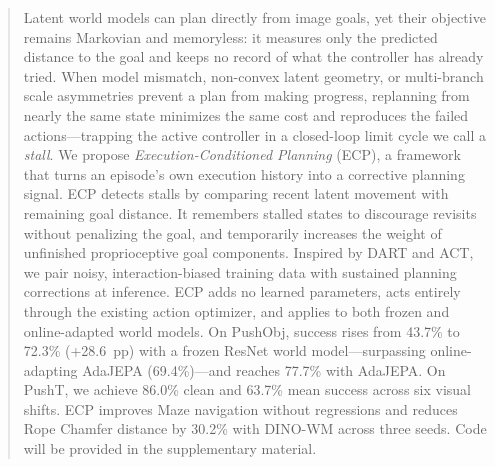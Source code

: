 \begin{abstract}
Latent world models can plan directly from image goals, yet their objective remains Markovian and memoryless: it measures only the predicted distance to the goal and keeps no record of what the controller has already tried. When model mismatch, non-convex latent geometry, or multi-branch scale asymmetries prevent a plan from making progress, replanning from nearly the same state minimizes the same cost and reproduces the failed actions---trapping the active controller in a closed-loop limit cycle we call a \emph{stall}. We propose \emph{Execution-Conditioned Planning} (ECP), a framework that turns an episode's own execution history into a corrective planning signal. ECP detects stalls by comparing recent latent movement with remaining goal distance. It remembers stalled states to discourage revisits without penalizing the goal, and temporarily increases the weight of unfinished proprioceptive goal components. Inspired by DART and ACT, we pair noisy, interaction-biased training data with sustained planning corrections at inference. ECP adds no learned parameters, acts entirely through the existing action optimizer, and applies to both frozen and online-adapted world models. On PushObj, success rises from 43.7\% to 72.3\% (+28.6~pp) with a frozen ResNet world model---surpassing online-adapting AdaJEPA (69.4\%)---and reaches 77.7\% with AdaJEPA. On PushT, we achieve 86.0\% clean and 63.7\% mean success across six visual shifts. ECP improves Maze navigation without regressions and reduces Rope Chamfer distance by 30.2\% with DINO-WM across three seeds. Code will be provided in the supplementary material.
\end{abstract}
